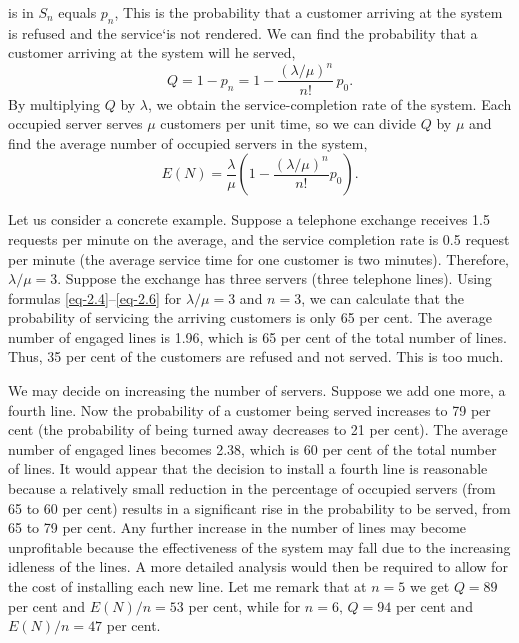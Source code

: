is in $S_{n}$ equals $p_{n}$, This is the probability that a customer arriving at the system is refused and the service‘is not rendered. We can find the
probability that a customer arriving at the system will he served,
\begin{equation}%
Q = 1 - p_{n} = 1 - \frac{(\lambda/\mu)^{n}}{n!}\, p_{0}.
\label{eq-2.5}
\end{equation}
By multiplying $Q$ by $\lambda$, we obtain the service-completion rate of the
system. Each occupied server serves $\mu$ customers per unit time, so we
can divide $Q$ by $\mu$ and find the average number of occupied servers in
the system,
\begin{equation}%
E(N) = \frac{\lambda}{\mu} \left( 1 - \frac{(\lambda/\mu)^{n}}{n!}  p_{0} \right).
\label{eq-2.6}
\end{equation}

 Let us consider a concrete example.
Suppose a telephone exchange receives 1.5 requests per minute on the
average, and the service completion rate is 0.5 request per minute (the average service time for one customer is two minutes). Therefore, $\lambda/\mu = 3$. Suppose the exchange has three servers (three telephone lines). Using formulas \eqref{eq-2.4}--\eqref{eq-2.6} for $\lambda/\mu = 3$ and $n = 3$, we can calculate that the probability of servicing the arriving customers is only 65 per cent. The average number of engaged lines is 1.96, which is 65 per cent of the total number of lines. Thus, 35 per cent of the customers are refused and not served. This is too much. 

We may decide on increasing the number of servers. Suppose we add one more, a fourth line. Now the probability of a customer being served increases to 79 per cent (the probability of being turned away decreases to 21 per cent). The average number of engaged lines becomes 2.38, which is 60 per cent of the total number of lines. It would appear that the decision to install a fourth line is reasonable because a relatively small reduction in the percentage of occupied servers (from 65 to 60 per cent) results in a significant rise in the probability to be served, from 65 to 79 per cent. Any further increase in the number of lines may become unprofitable because the effectiveness of the system may fall due to the increasing idleness of the lines. A more detailed analysis would then be required to allow for the cost of installing each new line. Let me remark that at $n = 5$ we get $Q= 89$ per cent and $E(N)/n = 53$ per cent, while for $n= 6, \, Q= 94$ per cent and $E (N)/n = 47$ per cent.

